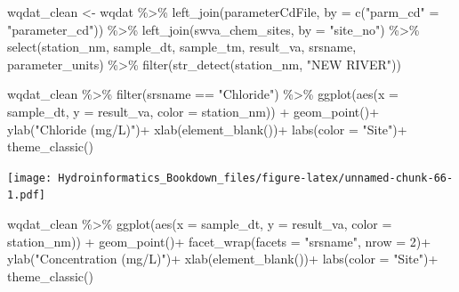 \documentclass[
]{book}
\newenvironment{Shaded}{\begin{snugshade}}{\end{snugshade}}
\newcommand{\AttributeTok}[1]{\textcolor[rgb]{0.77,0.63,0.00}{#1}}
\newcommand{\DecValTok}[1]{\textcolor[rgb]{0.00,0.00,0.81}{#1}}
\newcommand{\FunctionTok}[1]{\textcolor[rgb]{0.00,0.00,0.00}{#1}}
\newcommand{\NormalTok}[1]{#1}
\newcommand{\OtherTok}[1]{\textcolor[rgb]{0.56,0.35,0.01}{#1}}
\newcommand{\SpecialCharTok}[1]{\textcolor[rgb]{0.00,0.00,0.00}{#1}}
\newcommand{\StringTok}[1]{\textcolor[rgb]{0.31,0.60,0.02}{#1}}
\begin{document}
\begin{Shaded}
\begin{Highlighting}[]
\NormalTok{wqdat\_clean }\OtherTok{\textless{}{-}}\NormalTok{ wqdat }\SpecialCharTok{\%\textgreater{}\%} 
  \FunctionTok{left\_join}\NormalTok{(parameterCdFile, }\AttributeTok{by =} \FunctionTok{c}\NormalTok{(}\StringTok{"parm\_cd"} \OtherTok{=} \StringTok{"parameter\_cd"}\NormalTok{)) }\SpecialCharTok{\%\textgreater{}\%}
  \FunctionTok{left\_join}\NormalTok{(swva\_chem\_sites, }\AttributeTok{by =} \StringTok{"site\_no"}\NormalTok{) }\SpecialCharTok{\%\textgreater{}\%}
  \FunctionTok{select}\NormalTok{(station\_nm, sample\_dt, sample\_tm, result\_va, srsname, parameter\_units) }\SpecialCharTok{\%\textgreater{}\%}
  \FunctionTok{filter}\NormalTok{(}\FunctionTok{str\_detect}\NormalTok{(station\_nm, }\StringTok{"NEW RIVER"}\NormalTok{))}
  
\NormalTok{wqdat\_clean }\SpecialCharTok{\%\textgreater{}\%} \FunctionTok{filter}\NormalTok{(srsname }\SpecialCharTok{==} \StringTok{"Chloride"}\NormalTok{) }\SpecialCharTok{\%\textgreater{}\%}
  \FunctionTok{ggplot}\NormalTok{(}\FunctionTok{aes}\NormalTok{(}\AttributeTok{x =}\NormalTok{ sample\_dt, }\AttributeTok{y =}\NormalTok{ result\_va, }\AttributeTok{color =}\NormalTok{ station\_nm)) }\SpecialCharTok{+}
  \FunctionTok{geom\_point}\NormalTok{()}\SpecialCharTok{+}
  \FunctionTok{ylab}\NormalTok{(}\StringTok{"Chloride (mg/L)"}\NormalTok{)}\SpecialCharTok{+}
  \FunctionTok{xlab}\NormalTok{(}\FunctionTok{element\_blank}\NormalTok{())}\SpecialCharTok{+}
  \FunctionTok{labs}\NormalTok{(}\AttributeTok{color =} \StringTok{"Site"}\NormalTok{)}\SpecialCharTok{+}
  \FunctionTok{theme\_classic}\NormalTok{()}
\end{Highlighting}
\end{Shaded}

\texttt{[image: Hydroinformatics\_Bookdown\_files/figure-latex/unnamed-chunk-66-1.pdf]}

\begin{Shaded}
\begin{Highlighting}[]
\NormalTok{wqdat\_clean }\SpecialCharTok{\%\textgreater{}\%}
  \FunctionTok{ggplot}\NormalTok{(}\FunctionTok{aes}\NormalTok{(}\AttributeTok{x =}\NormalTok{ sample\_dt, }\AttributeTok{y =}\NormalTok{ result\_va, }\AttributeTok{color =}\NormalTok{ station\_nm)) }\SpecialCharTok{+}
  \FunctionTok{geom\_point}\NormalTok{()}\SpecialCharTok{+}
  \FunctionTok{facet\_wrap}\NormalTok{(}\AttributeTok{facets =} \StringTok{"srsname"}\NormalTok{, }\AttributeTok{nrow =} \DecValTok{2}\NormalTok{)}\SpecialCharTok{+}
  \FunctionTok{ylab}\NormalTok{(}\StringTok{"Concentration (mg/L)"}\NormalTok{)}\SpecialCharTok{+}
  \FunctionTok{xlab}\NormalTok{(}\FunctionTok{element\_blank}\NormalTok{())}\SpecialCharTok{+}
  \FunctionTok{labs}\NormalTok{(}\AttributeTok{color =} \StringTok{"Site"}\NormalTok{)}\SpecialCharTok{+}
  \FunctionTok{theme\_classic}\NormalTok{()}
\end{Highlighting}
\end{Shaded}
\end{document}
